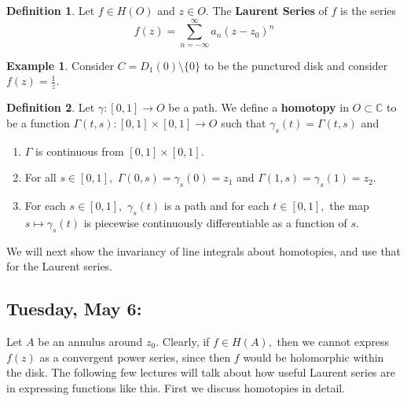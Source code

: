 \documentclass[10pt, oneside]{article}
\newcommand{\bbC}{\mathbb{C}}
\newcommand{\sm}{\setminus}
\theoremstyle{definition}
\newtheorem{exmp}{Example}[section]
\newtheorem{defn}{Definition}
\begin{document}
\begin{defn}
Let $f\in H(O)$ and $z\in O.$ The \textbf{Laurent Series} of $f$ is the series
    \[f(z) = \sum_{n=-\infty}^\infty a_n (z - z_0)^n\]
\end{defn}
\begin{exmp}
    Consider $C = D_1(0)\sm \{0\}$ to be the punctured disk and consider $f(z) = \frac{1}{z}.$
\end{exmp}
\begin{defn}
Let $\gamma:[0,1] \to O$ be a path.
    We define a \textbf{homotopy} in $O \subset \bbC$ to be a function $\Gamma(t,s) : [0,1] \times [0,1] \to O$ such that $\gamma_s(t) = \Gamma(t,s)$ and
    \begin{enumerate}
        \item $\Gamma$ is continuous from $[0,1]\times [0,1].$
        \item For all $s\in [0,1],$ $\Gamma(0,s) = \gamma_s(0) = z_1$ and $\Gamma(1,s) = \gamma_s(1) = z_2.$
        \item For each $s\in [0,1],$ $\gamma_s(t)$ is a path and for each $t\in [0,1],$ the map $s\mapsto \gamma_s(t)$ is piecewise continuously differentiable as a function of $s.$
    \end{enumerate}
\end{defn}

We will next show the invariancy of line integrals about homotopies, and use that for the Laurent series. 


\newpage
\subsection*{Tuesday, May 6: }
Let $A$ be an annulus around $z_0.$ Clearly, if $f \in H(A),$ then we cannot express $f(z)$ as a convergent power series, since then $f$ would be holomorphic within the disk. The following few lectures will talk about how useful Laurent series are in expressing functions like this. First we discuss homotopies in detail.
\end{document}
